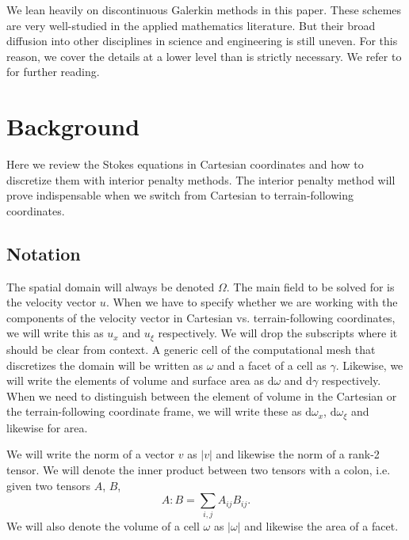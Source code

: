 \documentclass[gmd, manuscript]{copernicus}
\begin{document}
We lean heavily on discontinuous Galerkin methods in this paper.
These schemes are very well-studied in the applied mathematics literature.
But their broad diffusion into other disciplines in science and engineering is still uneven.
For this reason, we cover the details at a lower level than is strictly necessary.
We refer to \citet{di2011mathematical} for further reading.


\section{Background}

Here we review the Stokes equations in Cartesian coordinates and how to discretize them with interior penalty methods.
The interior penalty method will prove indispensable when we switch from Cartesian to terrain-following coordinates.

\subsection{Notation}

The spatial domain will always be denoted $\Omega$.
The main field to be solved for is the velocity vector $u$.
When we have to specify whether we are working with the components of the velocity vector in Cartesian vs. terrain-following coordinates, we will write this as $u_x$ and $u_\xi$ respectively.
We will drop the subscripts where it should be clear from context.
A generic cell of the computational mesh that discretizes the domain will be written as $\omega$ and a facet of a cell as $\gamma$.
Likewise, we will write the elements of volume and surface area as $\mathrm d\omega$ and $\mathrm d\gamma$ respectively.
When we need to distinguish between the element of volume in the Cartesian or the terrain-following coordinate frame, we will write these as $\mathrm d\omega_x$, $\mathrm d\omega_\xi$ and likewise for area.

We will write the norm of a vector $v$ as $|v|$ and likewise the norm of a rank-2 tensor.
We will denote the inner product between two tensors with a colon, i.e. given two tensors $A$, $B$,
\begin{equation}
    A : B = \sum_{i,j}A_{ij}B_{ij}.
\end{equation}
We will also denote the volume of a cell $\omega$ as $|\omega|$ and likewise the area of a facet.
\end{document}
